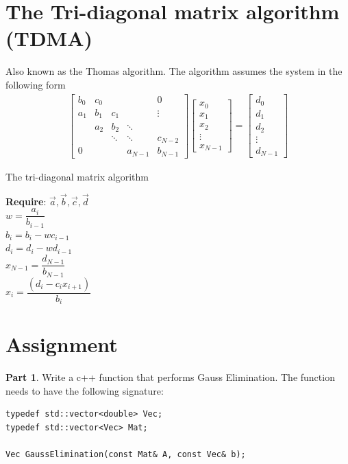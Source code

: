 \documentclass[10pt,letterpaper,notitlepage]{article}
\renewcommand{\vec}[1]{\mbox{$\stackrel{\longrightarrow}{#1}$}}
\newcommand{\beq}{\begin{equation*} \begin{aligned}}
\newcommand{\eeq}{\end{aligned}\end{equation*}}
\begin{document}
\section{The Tri-diagonal matrix algorithm (TDMA)}
Also known as the Thomas algorithm. The algorithm assumes the system in the following form
\beq
\begin{bmatrix}
b_0 & c_0 &  &  & 0 \\
a_1 & b_1 & c_1    &  & \vdots \\
 & a_2 & b_2 & \ddots &\\
 & & \ddots & \ddots & c_{N-2} \\
 0 & & & a_{N-1} & b_{N-1}
\end{bmatrix}
\begin{bmatrix}
x_0 \\ x_1 \\ x_2 \\ \vdots \\ x_{N-1}
\end{bmatrix}
=
\begin{bmatrix}
d_0 \\ d_1 \\ d_2 \\ \vdots \\ d_{N-1}
\end{bmatrix}
\eeq 

\begin{algorithm}
\caption{The tri-diagonal matrix algorithm}
\textbf{Require}: $\vec{a}, \vec{b}, \vec{c}, \vec{d}$\\
{
	$w = \dfrac{a_i}{b_{i-1}}$\\
	$b_i = b_i - w c_{i-1}$\\
	$d_i = d_i - w d_{i-1}$\\
}
$x_{N-1} = \dfrac{d_{N-1}}{b_{N-1}}$\\
{
	$x_i = \dfrac{(d_i - c_i x_{i+1})}{b_i}$
}
\end{algorithm}

\newpage
\section{Assignment}
\textbf{Part 1}. Write a c++ function that performs Gauss Elimination. The function needs to have the following signature:

\begin{verbatim}
typedef std::vector<double> Vec;
typedef std::vector<Vec> Mat;

Vec GaussElimination(const Mat& A, const Vec& b);
\end{verbatim}
\end{document}
